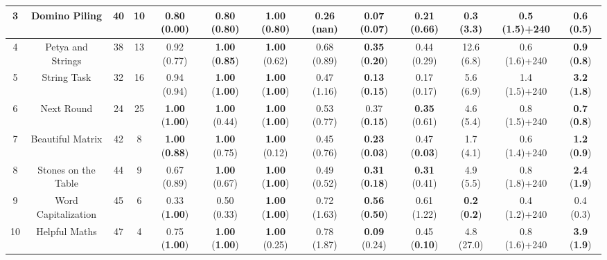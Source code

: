 \documentclass[10pt,conference]{IEEEtran}
\begin{document}
\begin{table}[hb!]
{\begin{tabular}{ |c|c|c|c|ccc|ccc|ccc| }
            \hline
            3 & Domino Piling & 40 & 10 & 
            0.80 (0.00)& 0.80 (\textbf{0.80}) & \textbf{1.00} (\textbf{0.80}) & 
            0.26 (nan) & \textbf{0.07} (\textbf{0.07}) & 0.21 (0.66) & 
            \textbf{0.3} (3.3) & 0.5 (1.5)+240 & 0.6 (\textbf{0.5}) \\
            \hline
            4 & Petya and Strings & 38 & 13 & 
            0.92 (0.77)& \textbf{1.00} (\textbf{0.85}) & \textbf{1.00} (0.62) & 
            0.68 (0.89) & \textbf{0.35} (\textbf{0.20}) & 0.44 (0.29) & 
            12.6 (6.8) & 0.6 (1.6)+240 & \textbf{0.9} (\textbf{0.8}) \\
            \hline
            5 & String Task & 32 & 16 & 
            0.94 (0.94)& \textbf{1.00} (\textbf{1.00}) & \textbf{1.00} (\textbf{1.00}) & 
            0.47 (1.16) & \textbf{0.13} (\textbf{0.15}) & 0.17 (0.17) & 
            5.6 (6.9) & 1.4 (1.5)+240 & \textbf{3.2} (\textbf{1.8}) \\
            \hline
            6 & Next Round & 24 & 25 & 
            \textbf{1.00} (\textbf{1.00})& \textbf{1.00} (0.44) & \textbf{1.00} (\textbf{1.00}) & 
            0.53 (0.77) & 0.37 (\textbf{0.15}) & \textbf{0.35} (0.61) & 
            4.6 (5.4) & 0.8 (1.5)+240 & \textbf{0.7} (\textbf{0.8}) \\
            \hline
            7 & Beautiful Matrix & 42 & 8 & 
            \textbf{1.00} (\textbf{0.88})& \textbf{1.00} (0.75) & \textbf{1.00} (0.12) & 
            0.45 (0.76) & \textbf{0.23} (\textbf{0.03}) & 0.47 (\textbf{0.03}) & 
            1.7 (4.1) & 0.6 (1.4)+240 & \textbf{1.2} (\textbf{0.9}) \\
            \hline
            8 & Stones on the Table & 44 & 9 & 
            0.67 (0.89)& \textbf{1.00} (0.67) & \textbf{1.00} (\textbf{1.00}) & 
            0.49 (0.52) & \textbf{0.31} (\textbf{0.18}) & \textbf{0.31} (0.41) & 
            4.9 (5.5) & 0.8 (1.8)+240 & \textbf{2.4} (\textbf{1.9}) \\
            \hline
            9 & Word Capitalization & 45 & 6 & 
            0.33 (\textbf{1.00})& 0.50 (0.33) & \textbf{1.00} (\textbf{1.00}) & 
            0.72 (1.63) & \textbf{0.56} (\textbf{0.50}) & 0.61 (1.22) & 
            \textbf{0.2} (\textbf{0.2}) & 0.4 (1.2)+240 & 0.4 (0.3) \\
            \hline
            10 & Helpful Maths & 47 & 4 & 
            0.75 (\textbf{1.00})& \textbf{1.00} (\textbf{1.00}) & \textbf{1.00} (0.25) & 
            0.78 (1.87) & \textbf{0.09} (0.24) & 0.45 (\textbf{0.10}) & 
            4.8 (27.0) & 0.8 (1.6)+240 & \textbf{3.9} (\textbf{1.9}) \\

\end{tabular}}
\end{table}
\end{document}
